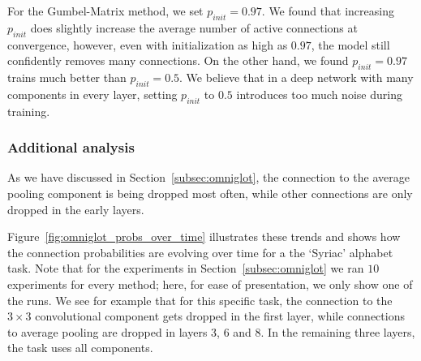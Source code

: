 \documentclass[conference]{IEEEtran}
\begin{document}
For the Gumbel-Matrix method, we set $p_{init} = 0.97$. We found that increasing $p_{init}$ does slightly increase the average number of active connections at convergence, however, even with initialization as high as $0.97$, the model still confidently removes many connections. On the other hand, we found $p_{init} = 0.97$ trains much better than $p_{init} = 0.5$. We believe that in a deep network with many components in every layer, setting $p_{init}$ to $0.5$ introduces too much noise during training.

\subsubsection{Additional analysis}\label{sec:prob_over_time_vis}

As we have discussed in Section~\ref{subsec:omniglot}, the connection to the average pooling component is being dropped most often, while other connections are only dropped in the early layers.

Figure~\ref{fig:omniglot_probs_over_time} illustrates these trends and shows how the connection probabilities are evolving over time for a the `Syriac' alphabet task. Note that for the experiments in Section~\ref{subsec:omniglot} we ran $10$ experiments for every method; here, for ease of presentation, we only show one of the runs. We see for example that for this specific task, the connection to the $3 \times 3$ convolutional component gets dropped in the first layer, while connections to average pooling are dropped in layers 3, 6 and 8. In the remaining three layers, the task uses all components.
\end{document}
